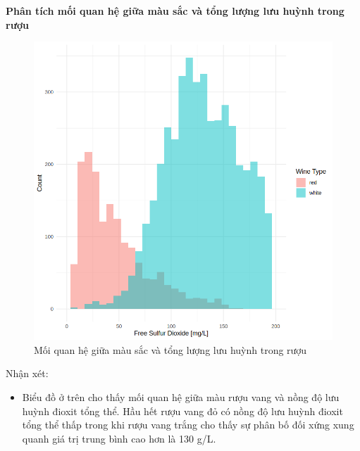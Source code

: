 \textbf{Phân tích mối quan hệ giữa màu sắc và tổng lượng lưu huỳnh trong rượu}
\begin{figure}[H]
    \centering
    \includegraphics[width=0.75\columnwidth]{wine_colors/wine_color_sulfur.png}
    \caption{Mối quan hệ giữa màu sắc và tổng lượng lưu huỳnh trong rượu}
    \label{fig:wine_color_sulfur}
\end{figure}
Nhận xét:
\begin{itemize}
    \item Biểu đồ ở trên cho thấy mối quan hệ giữa màu rượu vang và nồng độ lưu huỳnh đioxit tổng thể. Hầu hết rượu vang đỏ có nồng độ lưu huỳnh đioxit tổng thể thấp trong khi rượu vang trắng cho thấy sự phân bố đối xứng xung quanh giá trị trung bình cao hơn là 130 g/L.
\end{itemize}

